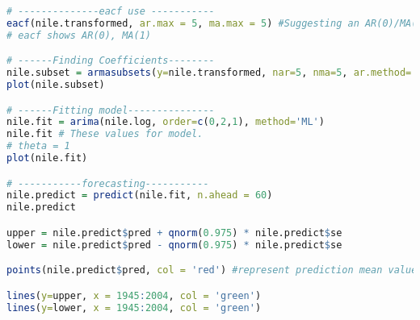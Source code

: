 \documentclass{article}
\begin{document}
\begin{lstlisting}[language=R]
# --------------eacf use -----------
eacf(nile.transformed, ar.max = 5, ma.max = 5) #Suggesting an AR(0)/MA(1). BUT because MA showing weak movement at 7, row down may be more significant, meaning MA(1)/weak AR(1),
# eacf shows AR(0), MA(1)

# ------Finding Coefficients--------
nile.subset = armasubsets(y=nile.transformed, nar=5, nma=5, ar.method='ols')
plot(nile.subset) 

# ------Fitting model---------------
nile.fit = arima(nile.log, order=c(0,2,1), method='ML') 
nile.fit # These values for model. 
# theta = 1
plot(nile.fit)

# -----------forecasting-----------
nile.predict = predict(nile.fit, n.ahead = 60)
nile.predict

upper = nile.predict$pred + qnorm(0.975) * nile.predict$se
lower = nile.predict$pred - qnorm(0.975) * nile.predict$se

points(nile.predict$pred, col = 'red') #represent prediction mean value

lines(y=upper, x = 1945:2004, col = 'green')
lines(y=lower, x = 1945:2004, col = 'green')

\end{lstlisting}



\end{document}
